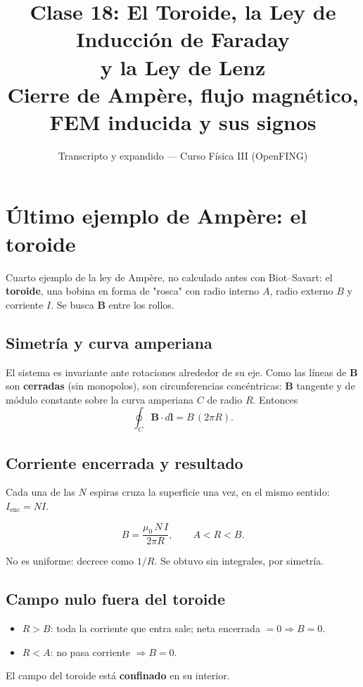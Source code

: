 \documentclass[12pt,a4paper]{article}
\title{\textbf{Clase 18: El Toroide, la Ley de Inducción de Faraday \\
        y la Ley de Lenz}\\[0.3em]
        \large{Cierre de Ampère, flujo magnético, FEM inducida y sus signos}}
\author{Transcripto y expandido --- Curso Física III (OpenFING)}
\date{}
\begin{document}
\maketitle
\thispagestyle{empty}
\newpage

\tableofcontents
\newpage

\section{Último ejemplo de Ampère: el toroide}

Cuarto ejemplo de la ley de Ampère, no calculado antes con Biot--Savart: el
\textbf{toroide}, una bobina en forma de "rosca" con radio interno $A$, radio
externo $B$ y corriente $I$. Se busca $\mathbf{B}$ entre los rollos.

\subsection{Simetría y curva amperiana}

El sistema es invariante ante rotaciones alrededor de su eje. Como las líneas
de $\mathbf{B}$ son \textbf{cerradas} (sin monopolos), son circunferencias
concéntricas: $\mathbf{B}$ tangente y de módulo constante sobre la curva
amperiana $C$ de radio $R$. Entonces
\[
\oint_C \mathbf{B}\cdot d\mathbf{l} = B\,(2\pi R).
\]

\subsection{Corriente encerrada y resultado}

Cada una de las $N$ espiras cruza la superficie una vez, en el mismo sentido:
$I_{\text{enc}} = N I$.

\begin{keybox}
  \[
  \boxed{B = \frac{\mu_0\, N\, I}{2\pi R}}, \qquad A < R < B.
  \]
\end{keybox}

No es uniforme: decrece como $1/R$. Se obtuvo sin integrales, por simetría.

\subsection{Campo nulo fuera del toroide}

\begin{itemize}[nosep]
  \item $R > B$: toda la corriente que entra sale; neta encerrada $=0
        \Rightarrow B=0$.
  \item $R < A$: no pasa corriente $\Rightarrow B=0$.
\end{itemize}
El campo del toroide está \textbf{confinado} en su interior.
\end{document}
